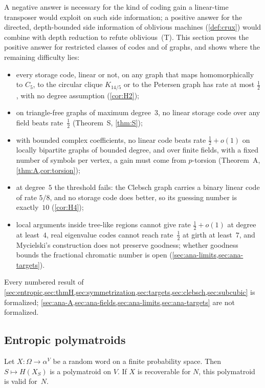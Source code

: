 A negative answer is necessary for the kind of coding gain a linear-time transposer would exploit on such side
information; a positive answer for the directed, depth-bounded side information of oblivious machines
(\cref{def:crux}) would combine with depth reduction to refute oblivious~(T). This section proves the positive answer for restricted classes of codes and of
graphs, and shows where the remaining difficulty lies:
\begin{itemize}[leftmargin=2em]
\item every storage code, linear or not, on any graph that maps homomorphically to $C_5$, to the circular clique
$K_{14/5}$ or to the Petersen graph has rate at most $\tfrac12$, with no degree assumption (\cref{cor:H2});
\item on triangle-free graphs of maximum degree~$3$, no linear storage code over any field beats rate~$\tfrac12$
(Theorem~S, \cref{thm:S});
\item with bounded complex coefficients, no linear code beats rate $\tfrac12+o(1)$ on locally bipartite graphs of
bounded degree, and over finite fields, with a fixed number of symbols per vertex, a gain must come from $p$-torsion
(Theorem~A, \cref{thm:A,cor:torsion});
\item at degree~$5$ the threshold fails: the Clebsch graph carries a binary linear code of rate $5/8$, and no storage code
does better, so its guessing number is exactly~$10$ (\cref{cor:H4});
\item local arguments inside tree-like regions cannot give rate $\tfrac12+o(1)$ at degree at least~$4$, real eigenvalue
codes cannot reach rate~$\tfrac12$ at girth at least~$7$, and Mycielski's construction does not preserve goodness;
whether goodness bounds the fractional chromatic number is open (\cref{sec:ana-limits,sec:ana-targets}).
\end{itemize}
Every numbered result of \cref{sec:entropic,sec:thmH,sec:symmetrization,sec:targets,sec:clebsch,sec:subcubic} is
formalized; \cref{sec:ana-A,sec:ana-fields,sec:ana-limits,sec:ana-targets} are not formalized.

\subsection{Entropic polymatroids}\label{sec:entropic}

\begin{lemma}\label{lem:entropic}
Let $X\colon\Omega\to\alpha^V$ be a random word on a finite probability space. Then $S\mapsto H(X_S)$ is a polymatroid on
$V$. If $X$ is recoverable for $N$, this polymatroid is valid for~$N$.
\end{lemma}


